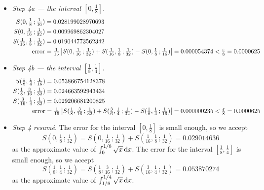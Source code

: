 {\begin{itemize}
\item \emph{Step 4a --- the interval $[0,\tfrac{1}{8}]$.}
\begin{align*}
S(0,\tfrac{1}{8}\,;\tfrac{1}{16})&= 0.028199028970693   \\
S(0,\tfrac{1}{16}\,;\tfrac{1}{32})&= 0.009969862304027   \\
S(\tfrac{1}{16},\tfrac{1}{8}\,;\tfrac{1}{32})&= 0.019044773562342   \\
\text{error}&=\tfrac{1}{15}\left|S(0,\tfrac{1}{16}\,;\tfrac{1}{32})
                              +S(\tfrac{1}{16},\tfrac{1}{8}\,;\tfrac{1}{32})
                              -S(0,\tfrac{1}{8}\,;\tfrac{1}{16})\right|
             =  0.000054374 < \tfrac{\varepsilon}{8} = 0.0000625
\end{align*}


\item \emph{Step 4b --- the interval $[\tfrac{1}{8},\tfrac{1}{4}]$.}
\begin{align*}
S(\tfrac{1}{8},\tfrac{1}{4}\,;\tfrac{1}{16})&= 0.053866754128378   \\
S(\tfrac{1}{8},\tfrac{3}{16}\,;\tfrac{1}{32})&= 0.024663592943434  \\
S(\tfrac{3}{16},\tfrac{1}{4}\,;\tfrac{1}{32})&= 0.029206681200825  \\
\text{error}&=\tfrac{1}{15}\left|S(\tfrac{1}{8},\tfrac{3}{16}\,;\tfrac{1}{32})
                              +S(\tfrac{3}{6},\tfrac{1}{4}\,;\tfrac{1}{32})
                              -S(\tfrac{1}{8},\tfrac{1}{4}\,;\tfrac{1}{16})\right|
             =  0.000000235  <\tfrac{\varepsilon}{8} = 0.0000625
\end{align*}


\item\emph{Step 4 resum\'e.} The error for the interval
$[0,\tfrac{1}{8}]$ is small enough, so we accept
\begin{equation*}
S(0,\tfrac{1}{8}\,;\tfrac{1}{32})
  = S(0,\tfrac{1}{16}\,;\tfrac{1}{32})
   + S(\tfrac{1}{16},\tfrac{1}{8}\,;\tfrac{1}{32})
  =  0.029014636
\end{equation*}
as the approximate value of $\int_0^{1/8}\sqrt{x}\,\mathrm{d}x$.
The error for the interval
$[\tfrac{1}{8},\tfrac{1}{4}]$ is small enough, so we accept
\begin{equation*}
S(\tfrac{1}{8},\tfrac{1}{4}\,;\tfrac{1}{32})
  = S(\tfrac{1}{8},\tfrac{3}{16}\,;\tfrac{1}{32})
   + S(\tfrac{3}{16},\tfrac{1}{4}\,;\tfrac{1}{32})
  = 0.053870274
\end{equation*}
as the approximate value of $\int_{1/8}^{1/4}\sqrt{x}\,\mathrm{d}x$.


\end{itemize}}
